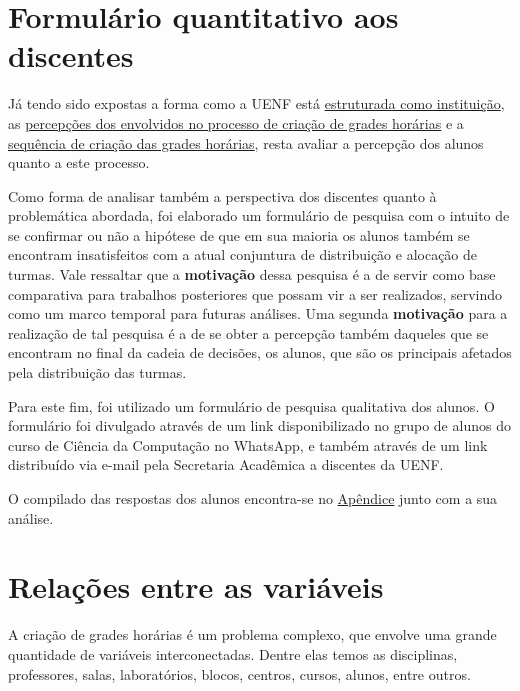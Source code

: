\section{Formulário quantitativo aos discentes} \label{sec:formulario} %

Já tendo sido expostas a forma como a UENF está \hyperref[sec:estatuto]{estruturada como instituição}, as \hyperref[sec:entrevistas]{percepções dos envolvidos no processo de criação de grades horárias} e a \hyperref[sec:sequencia]{sequência de criação das grades horárias}, resta avaliar a percepção dos alunos quanto a este processo.

Como forma de analisar também a perspectiva dos discentes quanto à problemática abordada, foi elaborado um formulário de pesquisa com o intuito de se confirmar ou não a hipótese de que em sua maioria os alunos também se encontram insatisfeitos com a atual conjuntura de distribuição e alocação de turmas. Vale ressaltar que a \textbf{motivação} dessa pesquisa é a de servir como base comparativa para trabalhos posteriores que possam vir a ser realizados, servindo como um marco temporal para futuras análises. Uma segunda \textbf{motivação} para a realização de tal pesquisa é a de se obter a percepção também daqueles que se encontram no final da cadeia de decisões, os alunos, que são os principais afetados pela distribuição das turmas.

Para este fim, foi utilizado um formulário de pesquisa qualitativa dos alunos. O formulário foi divulgado através de um link disponibilizado no grupo de alunos do curso de Ciência da Computação no WhatsApp, e também através de um link distribuído via e-mail pela Secretaria Acadêmica a discentes da UENF.

O compilado das respostas dos alunos encontra-se no \hyperref[chap:Formulário de pesquisa]{Apêndice} junto com a sua análise.

\section{Relações entre as variáveis} \label{sec:relacoes}  %

A criação de grades horárias é um problema complexo, que envolve uma grande quantidade de variáveis interconectadas. Dentre elas temos as disciplinas, professores, salas, laboratórios, blocos, centros, cursos, alunos, entre outros.

